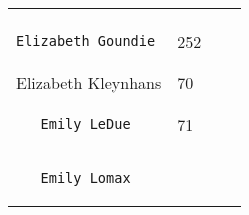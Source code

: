 \documentclass[]{article}
\begin{document}
\begin{longtable}[c]{@{}llll@{}}
\begin{minipage}[t]{0.15\columnwidth}
\end{minipage}
\\\noalign{\medskip}
\begin{minipage}[t]{0.39\columnwidth}\raggedright
\begin{verbatim}
Elizabeth Goundie
\end{verbatim}
\end{minipage} & \begin{minipage}[t]{0.10\columnwidth}\raggedright
252
\end{minipage} & \begin{minipage}[t]{0.13\columnwidth}\raggedright
\end{minipage} & \begin{minipage}[t]{0.15\columnwidth}\raggedright
\end{minipage}
\\\noalign{\medskip}
\begin{minipage}[t]{0.39\columnwidth}\raggedright
Elizabeth Kleynhans
\end{minipage} & \begin{minipage}[t]{0.10\columnwidth}\raggedright
70
\end{minipage} & \begin{minipage}[t]{0.13\columnwidth}\raggedright
\end{minipage} & \begin{minipage}[t]{0.15\columnwidth}\raggedright
\end{minipage}
\\\noalign{\medskip}
\begin{minipage}[t]{0.39\columnwidth}\raggedright
\begin{verbatim}
   Emily LeDue
\end{verbatim}
\end{minipage} & \begin{minipage}[t]{0.10\columnwidth}\raggedright
71
\end{minipage} & \begin{minipage}[t]{0.13\columnwidth}\raggedright
\end{minipage} & \begin{minipage}[t]{0.15\columnwidth}\raggedright
\end{minipage}
\\\noalign{\medskip}
\begin{minipage}[t]{0.39\columnwidth}\raggedright
\begin{verbatim}
   Emily Lomax
\end{verbatim}
\end{minipage} & \begin{minipage}[t]{0.10\columnwidth}\raggedright

\end{minipage}
\end{longtable}
\end{document}
